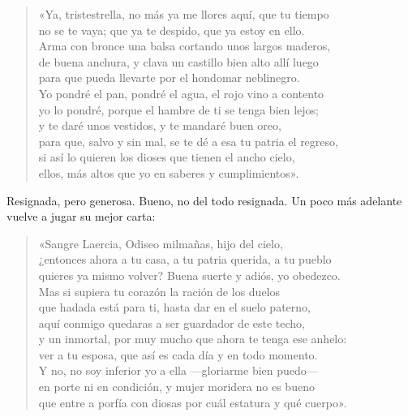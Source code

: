 \documentclass[11pt,a4paper]{article}
\begin{document}
\begin{verse}
«Ya, tristestrella, no más ya me llores aquí, que tu tiempo\\
no se te vaya; que ya te despido, que ya estoy en ello.\\
Arma con bronce una balsa cortando unos largos maderos,\\
de buena anchura, y clava un castillo bien alto allí luego\\
para que pueda llevarte por el hondomar neblinegro.\\
Yo pondré el pan, pondré el agua, el rojo vino a contento\\
yo lo pondré, porque el hambre de ti se tenga bien lejos;\\
y te daré unos vestidos, y te mandaré buen oreo,\\
para que, salvo y sin mal, se te dé a esa tu patria el regreso,\\
si así lo quieren los dioses que tienen el ancho cielo,\\
ellos, más altos que yo en saberes y cumplimientos».
\end{verse}

Resignada, pero generosa. Bueno, no del todo resignada. Un poco más adelante vuelve a jugar su mejor carta:

\begin{verse}
«Sangre Laercia, Odiseo milmañas, hijo del cielo,\\
¿entonces ahora a tu casa, a tu patria querida, a tu pueblo\\
quieres ya mismo volver? Buena suerte y adiós, yo obedezco.\\
Mas si supiera tu corazón la ración de los duelos\\
que hadada está para ti, hasta dar en el suelo paterno,\\
aquí conmigo quedaras a ser guardador de este techo,\\
y un inmortal, por muy mucho que ahora te tenga ese anhelo:\\
ver a tu esposa, que así es cada día y en todo momento.\\
Y no, no soy inferior yo a ella ---gloriarme bien puedo---\\
en porte ni en condición, y mujer moridera no es bueno\\
que entre a porfía con diosas por cuál estatura y qué cuerpo».
\end{verse}
\end{document}

